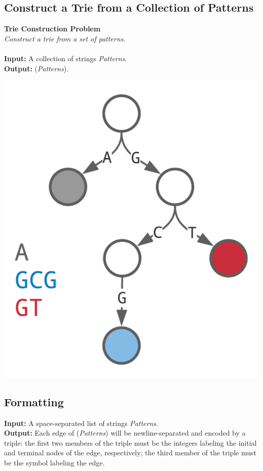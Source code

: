 \documentclass{article}
\renewcommand{\sc}[1]{\text{\scshape #1}}
\begin{document}
\subsection{Construct a Trie from a Collection of Patterns} 
\hline\vspace{5}
\textbf{Trie Construction Problem}\\
\emph{Construct a trie from a set of patterns}.\\ \\
\textbf{Input:} A collection of strings \emph{Patterns}.\\
\textbf{Output:} \sc{Trie}(\emph{Patterns}).
\begin{center}
    \includegraphics[scale=0.2]{c9/logos/9A.png}
\end{center}
\hline\vspace{5}

\subsection*{Formatting}
\noindent\textbf{Input:} A space-separated list of strings \emph{Patterns}.\\
\noindent\textbf{Output:} Each edge of \sc{Trie}(\emph{Patterns}) will be newline-separated and encoded by a triple: the first two members of the triple must be the integers labeling the initial and terminal nodes of the edge, respectively; the third member of the triple must be the symbol labeling the edge.
\end{document}
